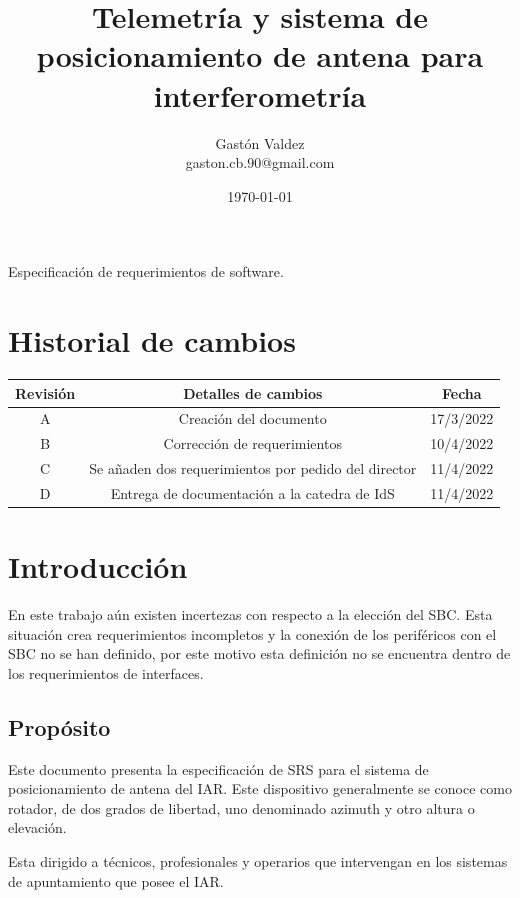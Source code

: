 \documentclass[12pt,a4paper, twosite]{article}
\date{\today}
\author{Gastón Valdez \\ gaston.cb.90@gmail.com}
\title{Telemetría y sistema de posicionamiento de antena para interferometría }
\begin{document}
\begin{titlepage}
\maketitle 
\centering \LARGE Especificación de requerimientos de software. 

\end{titlepage}

\section*{Historial de cambios  }
\begin{tabular}{|c|c|c|}
\hline 
Revisión & Detalles de cambios & Fecha  \\ \hline
A & Creación del documento & 17/3/2022 \\ \hline
B & Corrección de requerimientos &10/4/2022 \\ \hline
C & Se añaden dos requerimientos por pedido del director & 11/4/2022\\ \hline 
D & Entrega de documentación a la catedra de IdS & 11/4/2022 	\\ \hline 

\end{tabular}



\newpage
	\tableofcontents	
\newpage
	\section{Introducción}
	\label{sec:org60390fa}
	En este trabajo aún existen incertezas con respecto a la elección del SBC. Esta situación crea requerimientos incompletos y la conexión de los periféricos con el SBC no se han definido, por este motivo esta definición no se encuentra dentro de los requerimientos de interfaces. 
	\subsection{Propósito}
	\label{sec:org434c3ef}
	Este documento presenta la especificación de SRS para el sistema de  posicionamiento de antena del IAR. Este dispositivo generalmente se conoce como rotador, de dos grados de libertad, uno denominado azimuth y otro altura o elevación.  
	
	Esta dirigido a técnicos, profesionales y operarios que intervengan en los sistemas de apuntamiento que posee el IAR.   

	
	
\end{document}
